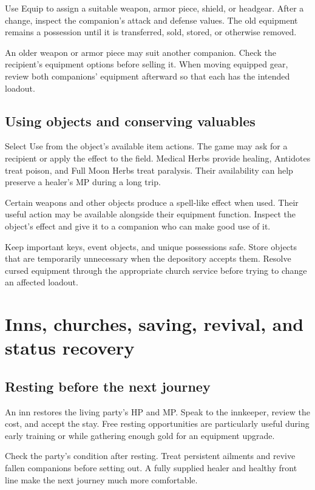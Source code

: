 Use Equip to assign a suitable weapon, armor piece, shield, or headgear.
After a change, inspect the companion's attack and defense values. The
old equipment remains a possession until it is transferred, sold, stored,
or otherwise removed.

An older weapon or armor piece may suit another companion. Check the
recipient's equipment options before selling it. When moving equipped
gear, review both companions' equipment afterward so that each has the
intended loadout.

\subsection*{Using objects and conserving valuables}

Select Use from the object's available item actions. The game may ask
for a recipient or apply the effect to the field. Medical Herbs provide
healing, Antidotes treat poison, and Full Moon Herbs treat paralysis.
Their availability can help preserve a healer's MP during a long trip.

Certain weapons and other objects produce a spell-like effect when used.
Their useful action may be available alongside their equipment function.
Inspect the object's effect and give it to a companion who can make good
use of it.

Keep important keys, event objects, and unique possessions safe. Store
objects that are temporarily unnecessary when the depository accepts
them. Resolve cursed equipment through the appropriate church service
before trying to change an affected loadout.

\section{Inns, churches, saving, revival, and status recovery}

\subsection*{Resting before the next journey}

An inn restores the living party's HP and MP. Speak to the innkeeper,
review the cost, and accept the stay. Free resting opportunities are
particularly useful during early training or while gathering enough gold
for an equipment upgrade.

Check the party's condition after resting. Treat persistent ailments and
revive fallen companions before setting out. A fully supplied healer and
healthy front line make the next journey much more comfortable.

